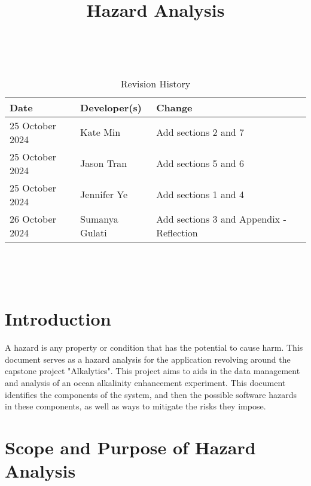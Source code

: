 \documentclass{article}
\title{Hazard Analysis\\\progname}
\author{\authname}
\date{}
\begin{document}
\maketitle
\thispagestyle{empty}

~\newpage


\begin{table}[hp]
\caption{Revision History} \label{TblRevisionHistory}
\begin{tabularx}{\textwidth}{llX}
\toprule
\textbf{Date} & \textbf{Developer(s)} & \textbf{Change}\\
\midrule
25 October 2024 & Kate Min & Add sections 2 and 7\\
25 October 2024 & Jason Tran & Add sections 5 and 6\\
25 October 2024 & Jennifer Ye & Add sections 1 and 4\\
26 October 2024 & Sumanya Gulati & Add sections 3 and Appendix - Reflection\\
\bottomrule
\end{tabularx}
\end{table}

~\newpage

\tableofcontents

~\newpage


\section{Introduction}

A hazard is any property or condition that has the potential to cause harm. This
document serves as a hazard analysis for the application revolving around the
capstone project "Alkalytics". This project aims to aids in the data management
and analysis of an ocean alkalinity enhancement experiment. This document
identifies the components of the system, and then the possible software hazards
in these components, as well as ways to mitigate the risks they impose.

\section{Scope and Purpose of Hazard Analysis}
\end{document}
